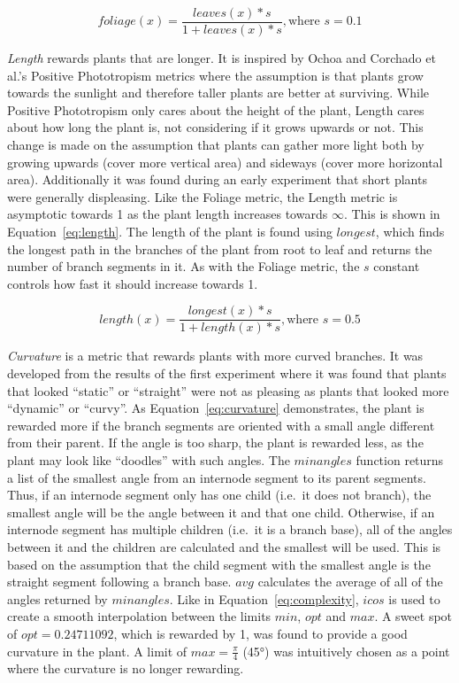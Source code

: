 \begin{equation}
\label{eq:foliage}
    foliage(x) = \frac{leaves(x) * s}{1 + leaves(x) * s}, \text{where } s = 0.1
\end{equation}

\textit{Length} rewards plants that are longer.
It is inspired by Ochoa and Corchado et al.'s Positive Phototropism metrics where the assumption is that plants grow towards the sunlight and therefore taller plants are better at surviving.
While Positive Phototropism only cares about the height of the plant, Length cares about how long the plant is, not considering if it grows upwards or not.
This change is made on the assumption that plants can gather more light both by growing upwards (cover more vertical area) and sideways (cover more horizontal area).
Additionally it was found during an early experiment that short plants were generally displeasing.
Like the Foliage metric, the Length metric is asymptotic towards 1 as the plant length increases towards $\infty$.
This is shown in Equation~\ref{eq:length}.
The length of the plant is found using $longest$, which finds the longest path in the branches of the plant from root to leaf and returns the number of \glspl{branch segment} in it.
As with the Foliage metric, the $s$ constant controls how fast it should increase towards 1.

\begin{equation}
\label{eq:length}
    length(x) = \frac{longest(x) * s}{1 + length(x) * s}, \text{where } s = 0.5
\end{equation}

\textit{Curvature} is a metric that rewards plants with more curved branches.
It was developed from the results of the first experiment where it was found that plants that looked ``static'' or ``straight'' were not as pleasing as plants that looked more ``dynamic'' or ``curvy''.
As Equation~\ref{eq:curvature} demonstrates, the plant is rewarded more if the \glspl{branch segment} are oriented with a small angle different from their parent.
If the angle is too sharp, the plant is rewarded less, as the plant may look like ``doodles'' with such angles.
The $minangles$ function returns a list of the smallest angle from an \gls{internode segment} to its parent segments.
Thus, if an \gls{internode segment} only has one child (i.e.\ it does not branch), the smallest angle will be the angle between it and that one child.
Otherwise, if an \gls{internode segment} has multiple children (i.e.\ it is a \gls{branch base}), all of the angles between it and the children are calculated and the smallest will be used.
This is based on the assumption that the \gls{child segment} with the smallest angle is the \gls{straight segment} following a \gls{branch base}.
$avg$ calculates the average of all of the angles returned by $minangles$.
Like in Equation~\ref{eq:complexity}, $icos$ is used to create a smooth interpolation between the limits $min$, $opt$ and $max$.
A sweet spot of $opt = 0.24711092$, which is rewarded by 1, was found to provide a good curvature in the plant.
A limit of $max = \frac{\pi}{4}$ (45°) was intuitively chosen as a point where the curvature is no longer rewarding.

